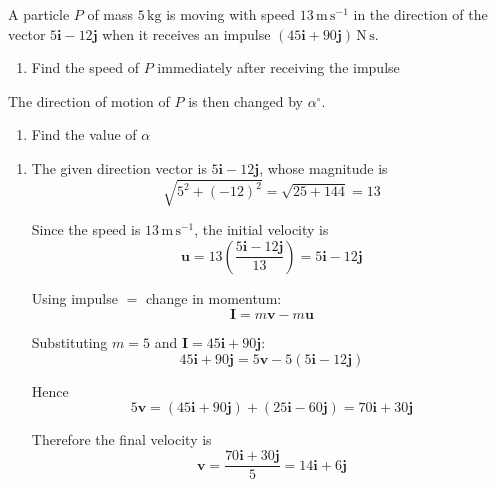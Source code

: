 \documentclass[leqno]{article}
\begin{document}
\djsFrontMatter
\begin{enumerate}[
  label=\textbf{\arabic*.},
  leftmargin=*,
  topsep=0pt,
  partopsep=0pt,
  parsep=0pt
]

\questionitem

A particle $P$ of mass $5\,\mathrm{kg}$ is moving with speed $13\,\mathrm{m\,s^{-1}}$ in the direction of the vector $5\mathbf{i}-12\mathbf{j}$ when it receives an impulse $(45\mathbf{i}+90\mathbf{j})\,\mathrm{N\,s}$. \\

\begin{enumerate}[label=\textbf{(\alph*)}]
  \item Find the speed of $P$ immediately after receiving the impulse  \\
\end{enumerate}
The direction of motion of $P$ is then changed by $\alpha^\circ$. \\
\begin{enumerate}[label=\textbf{(\alph*)}, resume]
  \item Find the value of $\alpha$  \\
\end{enumerate}

\vspace*{10pt}

\begin{djsSolution}
\begin{enumerate}[label=\textbf{(\alph*)}]
  \item The given direction vector is $5\mathbf{i}-12\mathbf{j}$, whose magnitude is
  \[
  \sqrt{5^2+(-12)^2}=\sqrt{25+144}=13
  \]

  Since the speed is $13\,\mathrm{m\,s^{-1}}$, the initial velocity is
  \[
  \mathbf{u}=13\left(\frac{5\mathbf{i}-12\mathbf{j}}{13}\right)=5\mathbf{i}-12\mathbf{j}
  \]

  Using impulse \(=\) change in momentum:
  \[
  \mathbf{I}=m\mathbf{v}-m\mathbf{u}
  \]

  Substituting $m=5$ and $\mathbf{I}=45\mathbf{i}+90\mathbf{j}$:
  \[
  45\mathbf{i}+90\mathbf{j}=5\mathbf{v}-5(5\mathbf{i}-12\mathbf{j})
  \]

  Hence
  \[
  5\mathbf{v}=(45\mathbf{i}+90\mathbf{j})+(25\mathbf{i}-60\mathbf{j})
  =70\mathbf{i}+30\mathbf{j}
  \]

  Therefore the final velocity is
  \[
  \mathbf{v}=\frac{70\mathbf{i}+30\mathbf{j}}{5}
  =14\mathbf{i}+6\mathbf{j}
  \]


\end{enumerate}
\end{djsSolution}
\end{enumerate}
\end{document}
